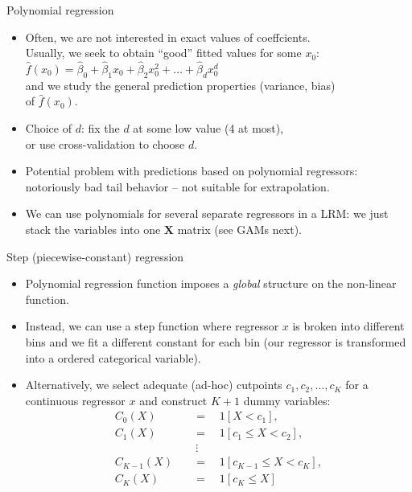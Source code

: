 \documentclass{beamer}
\begin{document}
\begin{frame}{Polynomial regression}
\begin{itemize}
    \item Often, we are not interested in exact values of coeffcients.\\
    Usually, we seek to obtain ``good'' fitted values for some $x_0$: \\ \smallskip 
    $\hat{f}(x_0) = \hat{\beta}_0 + \hat{\beta}_1 x_0 + \hat{\beta}_2 x_0^2 + \dots + \hat{\beta}_d x_0^d $\\ \smallskip 
    and we study the general  prediction properties (variance, bias) \\of  $\hat{f}(x_0)$.
    \smallskip
    \item Choice of $d$: fix the $d$ at some low value (4 at most), \\or use cross-validation to choose $d$.
    \smallskip
    \item Potential problem with predictions based on polynomial regressors: notoriously bad tail behavior -- not suitable for extrapolation.
    \smallskip 
    \item We can use polynomials for several separate regressors in a LRM: we just stack the variables into one $\bm{X}$ matrix (see GAMs next).
    
\end{itemize}
\end{frame}
\begin{frame}{Step (piecewise-constant) regression}
\begin{itemize}
    \item Polynomial regression function imposes a \textit{global} structure on the non-linear function.
    \smallskip
    \item Instead, we can use a step function where regressor $x$ is broken into different bins and we fit a different constant for each bin (our regressor is transformed into a ordered categorical variable).
    \smallskip
    \item Alternatively, we select adequate (ad-hoc) cutpoints $c_1, c_2, \dots, c_K$ for a continuous regressor $x$ and construct $K+1$ dummy variables:
    \begin{equation*}
       \begin{aligned}
       C_0(X) \quad &= \quad 1[X < c_1], \\
       C_1(X) \quad &= \quad 1[c_1 \leq X < c_2], \\
        &~ \vdots \\
       C_{K-1}(X) \quad &= \quad 1[c_{K-1} \leq X < c_{K}], \\
       C_K(X) \quad &= \quad 1[c_{K} \leq X] \\
        \end{aligned}    
        \end{equation*}
\end{itemize}
\end{frame}
\end{document}

